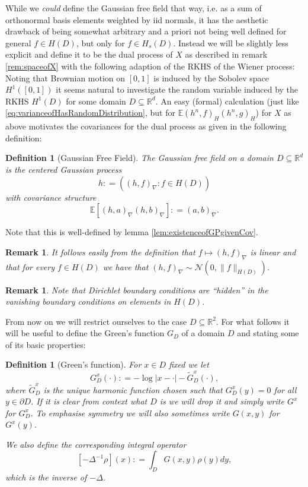 \documentclass[11pt,reqno]{amsart}
\numberwithin{equation}{section}
\newtheorem{defi}[thm]{Definition}
\newtheorem{rem}[thm]{Remark}
\newcommand{\deq}{\mathrel{\mathop:}=}
\begin{document}
While we \emph{could} define the Gaussian free field that way, i.e. as a sum of orthonormal basis elements weighted by iid normals, it has the aesthetic drawback of being somewhat arbitrary and a priori not being well defined for general $f\in H(D)$, but only for $f\in H_s(D)$. Instead we will be slightly less explicit and define it to be the dual process of $X$ as described in remark \ref{rem:spaceofX} with the following adaption of the RKHS of the Wiener process: Noting that Brownian motion on $[0,1]$ is induced by the Sobolev space $H^1([0,1])$ it seems natural to investigate the random variable induced by the RKHS $H^1(D)$ for some domain $D\subseteq\mathbb R^d$. An easy (formal) calculation (just like \eqref{eq:varianceofHasRandomDistribution}, but for $\mathbb E(h^n,f)_H(h^n,g)_H$) for $X$ as above motivates the covariances for the dual process as given in the following definition:

\begin{defi}[Gaussian Free Field]
	The Gaussian free field on a domain $D\subseteq\mathbb R^d$ is the centered Gaussian process $$h\deq ((h,f)_\nabla : f\in H(D))$$ with covariance structure $$\mathbb E[(h,a)_\nabla(h,b)_\nabla]\deq (a,b)_\nabla.$$
\end{defi}
Note that this is well-defined by lemma \ref{lem:existenceofGPgivenCov}.
\begin{rem}
	It follows easily from the definition that $f\mapsto (h,f)_\nabla$ is linear and that for every $f\in H(D)$ we have that $(h,f)_\nabla\sim\mathcal N(0,\|f\|_{H(D)})$.
\end{rem}

\begin{rem}
	Note that Dirichlet boundary conditions are ``hidden'' in the vanishing boundary conditions on elements in $H(D)$. %
\end{rem}From now on we will restrict ourselves to the case $D\subseteq\mathbb R^2$. For what follows it will be useful to define the Green's function $G_D$ of a domain $D$ and stating some of its basic properties:

\begin{defi}[Green's function]
	For $x\in D$ fixed we let $$G_D^x(\cdot)\deq -\log|x-\cdot|-\tilde G_D^x(\cdot),$$ where $\tilde G_D^x$ is the unique harmonic function chosen such that $G_D^x(y)=0$ for all $y\in\partial D$.
	If it is clear from context what $D$ is we will drop it and simply write $G^x$ for $G^x_D$.
	To emphasise symmetry we will also sometimes write $G(x,y)$ for $G^x(y)$.
	
	We also define the corresponding integral operator $$[-\Delta^{-1}\rho](x)\deq\int_D G(x,y)\rho(y)dy,$$ which is the inverse of $-\Delta$.
\end{defi}
\end{document}
